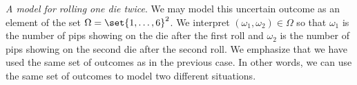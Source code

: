 \textit{A model for rolling one die twice}.
We may model this uncertain outcome as an element of the set $\Omega  = \set{1, \dots , 6}^2$.
We interpret $(\omega _1, \omega _2) \in \Omega $ so that $\omega _1$ is the number of pips showing on the die after the first roll and $\omega _2$ is the number of pips showing on the second die after the second roll.
We emphasize that we have used the same set of outcomes as in the previous case.
In other words, we can use the same set of outcomes to model two different situations.
